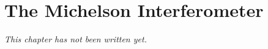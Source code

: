\chapter{The Michelson Interferometer}\label{ch:b2:michelson}


\emph{This chapter has not been written yet.}
